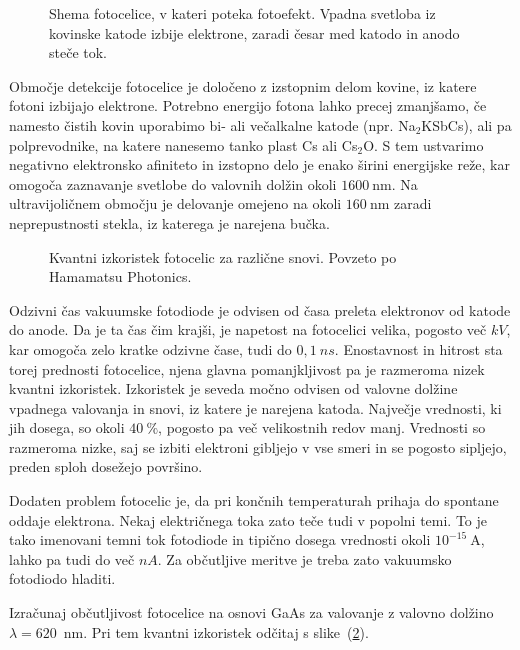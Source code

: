 \begin{figure}[h]
\centering
\def\svgwidth{60truemm} 

\caption{Shema fotocelice, v kateri poteka fotoefekt. 
Vpadna svetloba iz kovinske katode izbije elektrone, zaradi česar med katodo 
in anodo steče tok.}
\label{fig:Fotoefekt}
\end{figure}

Območje detekcije fotocelice je določeno z izstopnim delom kovine, iz 
katere fotoni izbijajo elektrone. Potrebno energijo fotona lahko precej zmanjšamo, 
če namesto čistih kovin uporabimo bi- ali večalkalne katode 
(npr. Na$_2$KSbCs), ali pa polprevodnike, na katere nanesemo tanko plast 
Cs ali Cs$_2$O. S tem ustvarimo negativno elektronsko afiniteto in 
izstopno delo je enako širini energijske
reže, kar omogoča zaznavanje svetlobe do valovnih dolžin okoli $1600~\si{\nano\metre}$. 
Na ultravijoličnem območju je delovanje
omejeno na okoli $160~\si{\nano\metre}$ zaradi neprepustnosti stekla, 
iz katerega je narejena bučka.
\begin{figure}[h]
\centering
\def\svgwidth{130truemm} 

\caption{Kvantni izkoristek fotocelic za različne snovi. Povzeto po Hamamatsu Photonics.}
\label{fig:Fotodioda}
\end{figure}

Odzivni čas vakuumske fotodiode je odvisen od časa preleta elektronov od katode do anode. 
Da je ta čas čim krajši, je napetost na fotocelici velika, pogosto več $\si{kV}$,
kar omogoča zelo kratke odzivne čase, tudi do $0,1~\si{ns}$. 
Enostavnost in hitrost sta torej prednosti fotocelice, 
njena glavna pomanjkljivost pa je razmeroma nizek kvantni izkoristek. 
Izkoristek je seveda močno odvisen od valovne dolžine vpadnega valovanja in snovi, iz 
katere je narejena katoda. Največje vrednosti, ki jih dosega, so okoli $40~\%$, 
pogosto pa več velikostnih redov manj. 
Vrednosti so razmeroma nizke, saj se izbiti elektroni gibljejo v vse
smeri in se pogosto sipljejo, preden sploh dosežejo površino. 

Dodaten problem fotocelic je, da pri končnih temperaturah prihaja do spontane oddaje elektrona.
Nekaj električnega toka zato teče tudi v popolni temi. To je tako imenovani temni 
tok fotodiode 
in tipično dosega vrednosti okoli $10^{-15}~\si{\ampere}$, lahko pa tudi do več $\si{nA}$. 
Za občutljive meritve je treba zato vakuumsko fotodiodo hladiti. 

\vskip1cm
\begin{definition}
Izračunaj občutljivost fotocelice na osnovi GaAs 
za valovanje z valovno dolžino $\lambda=620$~nm.
Pri tem kvantni izkoristek odčitaj s slike~(\ref{fig:Fotodioda}).
\end{definition}

